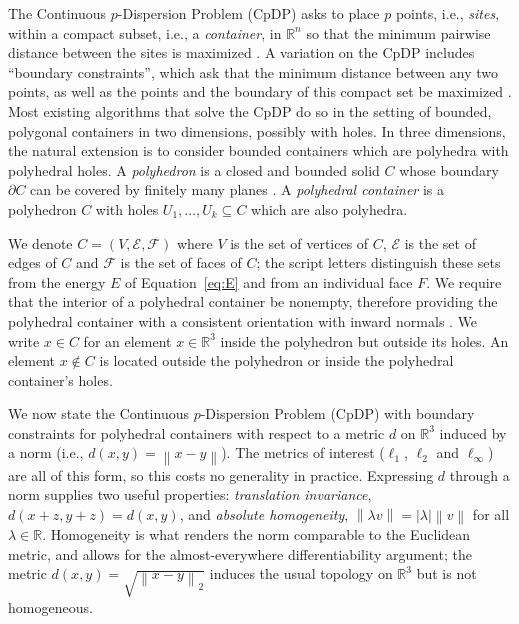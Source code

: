 \documentclass[preprint,12pt]{elsarticle}
\theoremstyle{remark}
\def \R {\mathbb{R}}
\def \abs#1{\left| #1 \right|}
\def \norm#1{\left\|#1 \right\|}
\begin{document}
The Continuous $p$-Dispersion Problem (CpDP) asks to place $p$ points, i.e.,
\textit{sites}, within a compact subset, i.e., a \textit{container}, in $\R^n$
so that the minimum pairwise distance between the sites is maximized
\citep{drezner1995}. A variation on the CpDP includes ``boundary constraints'',
which ask that the minimum distance between any two points, as well as the
points and the boundary of this compact set be maximized \citep{baurfekete2001}.
Most existing algorithms that solve the CpDP do so in the setting of bounded,
polygonal containers in two dimensions, possibly with holes. In three
dimensions, the natural extension is to consider bounded containers which are
polyhedra with polyhedral holes. A \textit{polyhedron} is a closed and bounded
solid $C$ whose boundary $\partial C$ can be covered by finitely many planes
\cite{berg2008}. A \textit{polyhedral container} is a polyhedron $C$ with holes
$U_1, \dots, U_k \subseteq C$ which are also polyhedra.

We denote $C = (V, \mathcal{E}, \mathcal{F})$ where $V$ is the set of vertices
of $C$, $\mathcal{E}$ is the set of edges of $C$ and $\mathcal{F}$ is the set of
faces of $C$; the script letters distinguish these sets from the energy $E$ of
Equation~\ref{eq:E} and from an individual face $F$. We require that the
interior of a polyhedral container be nonempty, therefore providing the
polyhedral container with a consistent orientation with inward normals
\citep{munkres1991}. We write $x \in C$ for an element $x \in \R^3$ inside the
polyhedron but outside its holes. An element $x \notin C$ is located outside the
polyhedron or inside the polyhedral container's holes.

We now state the Continuous $p$-Dispersion Problem (CpDP) \citep{drezner1995}
with boundary constraints for polyhedral containers with respect to a metric $d$
on $\R^3$ induced by a norm (i.e., $d(x, y) = \norm{x - y}$). The metrics of
interest ($\ell_1$, $\ell_2$ and $\ell_\infty$) are all of this form, so this
costs no generality in practice. Expressing $d$ through a norm supplies two
useful properties: \emph{translation invariance}, $d(x + z, y + z) = d(x, y)$,
and \emph{absolute homogeneity}, $\norm{\lambda v} = \abs{\lambda} \norm{v}$ for
all $\lambda \in \R$. Homogeneity is what renders the norm comparable to the
Euclidean metric, and allows for the almost-everywhere differentiability
argument; the metric $d(x, y) = \sqrt{\norm{x - y}_2}$ induces the usual
topology
on $\R^3$ but is not homogeneous. \\
\end{document}
